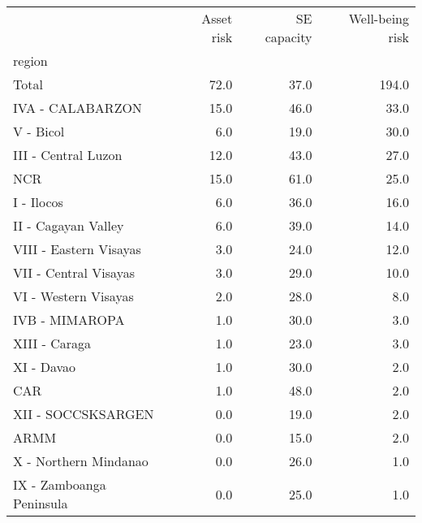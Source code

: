 \begin{tabular}{lrrr}
\toprule
{} &  Asset risk &  SE capacity &  Well-being risk \\
region                   &             &              &                  \\
\midrule
Total                    &        72.0 &         37.0 &            194.0 \\
IVA - CALABARZON         &        15.0 &         46.0 &             33.0 \\
V - Bicol                &         6.0 &         19.0 &             30.0 \\
III - Central Luzon      &        12.0 &         43.0 &             27.0 \\
NCR                      &        15.0 &         61.0 &             25.0 \\
I - Ilocos               &         6.0 &         36.0 &             16.0 \\
II - Cagayan Valley      &         6.0 &         39.0 &             14.0 \\
VIII - Eastern Visayas   &         3.0 &         24.0 &             12.0 \\
VII - Central Visayas    &         3.0 &         29.0 &             10.0 \\
VI - Western Visayas     &         2.0 &         28.0 &              8.0 \\
IVB - MIMAROPA           &         1.0 &         30.0 &              3.0 \\
XIII - Caraga            &         1.0 &         23.0 &              3.0 \\
XI - Davao               &         1.0 &         30.0 &              2.0 \\
CAR                      &         1.0 &         48.0 &              2.0 \\
XII - SOCCSKSARGEN       &         0.0 &         19.0 &              2.0 \\
ARMM                     &         0.0 &         15.0 &              2.0 \\
X - Northern Mindanao    &         0.0 &         26.0 &              1.0 \\
IX - Zamboanga Peninsula &         0.0 &         25.0 &              1.0 \\
\bottomrule
\end{tabular}
